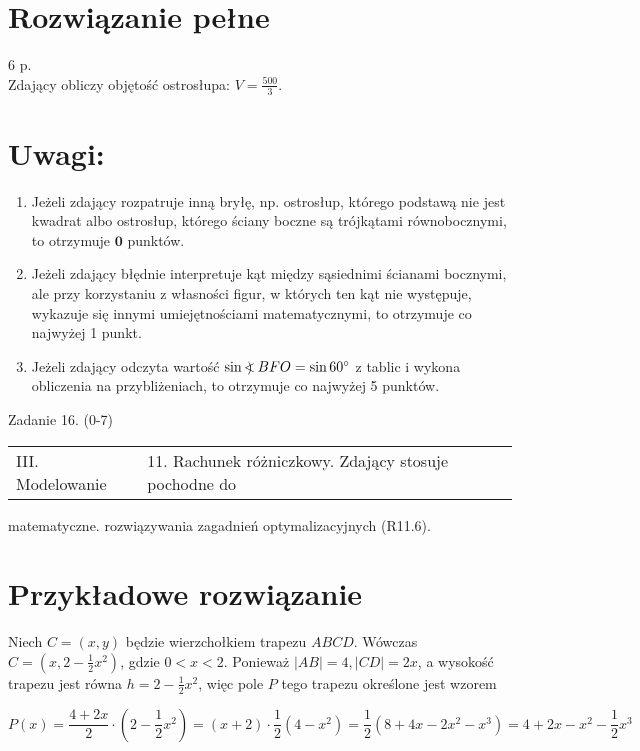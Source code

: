 \documentclass[10pt]{article}
\newcommand\Varangle{\mathop{{<\!\!\!\!\!\text{\small)}}\:}\nolimits}
\begin{document}
\section*{Rozwiązanie pełne}
6 p.\\
Zdający obliczy objętość ostrosłupa: $V=\frac{500}{3}$.

\section*{Uwagi:}
\begin{enumerate}
  \item Jeżeli zdający rozpatruje inną bryłę, np. ostrosłup, którego podstawą nie jest kwadrat albo ostrosłup, którego ściany boczne są trójkątami równobocznymi, to otrzymuje $\mathbf{0}$ punktów.
  \item Jeżeli zdający błędnie interpretuje kąt między sąsiednimi ścianami bocznymi, ale przy korzystaniu z własności figur, w których ten kąt nie występuje, wykazuje się innymi umiejętnościami matematycznymi, to otrzymuje co najwyżej 1 punkt.
  \item Jeżeli zdający odczyta wartość $\sin \Varangle B F O=\sin 60^{\circ}$ z tablic i wykona obliczenia na przybliżeniach, to otrzymuje co najwyżej 5 punktów.
\end{enumerate}

Zadanie 16. (0-7)

\begin{center}
\begin{tabular}{l|l}
III. Modelowanie & 11. Rachunek różniczkowy. Zdający stosuje pochodne do \\
\end{tabular}
\end{center} matematyczne. rozwiązywania zagadnień optymalizacyjnych (R11.6).

\section*{Przykładowe rozwiązanie}
Niech $C=(x, y)$ będzie wierzchołkiem trapezu $A B C D$. Wówczas $C=\left(x, 2-\frac{1}{2} x^{2}\right)$, gdzie $0<x<2$. Ponieważ $|A B|=4,|C D|=2 x$, a wysokość trapezu jest równa $h=2-\frac{1}{2} x^{2}$, więc pole $P$ tego trapezu określone jest wzorem

$$
P(x)=\frac{4+2 x}{2} \cdot\left(2-\frac{1}{2} x^{2}\right)=(x+2) \cdot \frac{1}{2}\left(4-x^{2}\right)=\frac{1}{2}\left(8+4 x-2 x^{2}-x^{3}\right)=4+2 x-x^{2}-\frac{1}{2} x^{3}
$$
\end{document}

